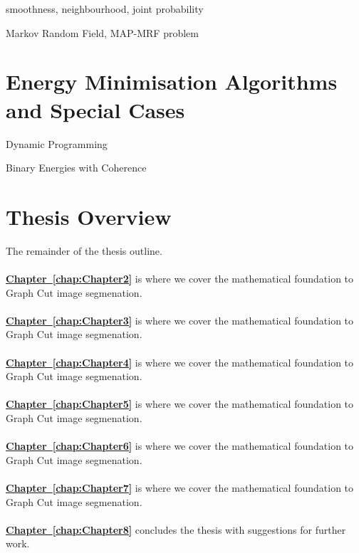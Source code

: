 smoothness, neighbourhood, joint probability

Markov Random Field, MAP-MRF problem


\section{Energy Minimisation Algorithms and Special Cases}\label{FillingFile}

Dynamic Programming 

Binary Energies with Coherence


\section{Thesis Overview}

The remainder of the thesis outline.\\
\\
\textbf{\hyperref[chap:Chapter2]{Chapter~\ref*{chap:Chapter2}}} is where we cover the mathematical foundation to Graph Cut image segmenation.\\
\\
\textbf{\hyperref[chap:Chapter3]{Chapter~\ref*{chap:Chapter3}}} is where we cover the mathematical foundation to Graph Cut image segmenation.\\
\\
\textbf{\hyperref[chap:Chapter4]{Chapter~\ref*{chap:Chapter4}}} is where we cover the mathematical foundation to Graph Cut image segmenation.\\
\\
\textbf{\hyperref[chap:Chapter5]{Chapter~\ref*{chap:Chapter5}}} is where we cover the mathematical foundation to Graph Cut image segmenation.\\
\\
\textbf{\hyperref[chap:Chapter6]{Chapter~\ref*{chap:Chapter6}}} is where we cover the mathematical foundation to Graph Cut image segmenation.\\
\\
\textbf{\hyperref[chap:Chapter7]{Chapter~\ref*{chap:Chapter7}}} is where we cover the mathematical foundation to Graph Cut image segmenation.\\
\\
\textbf{\hyperref[chap:Chapter8]{Chapter~\ref*{chap:Chapter8}}} concludes the thesis with suggestions for further work.
